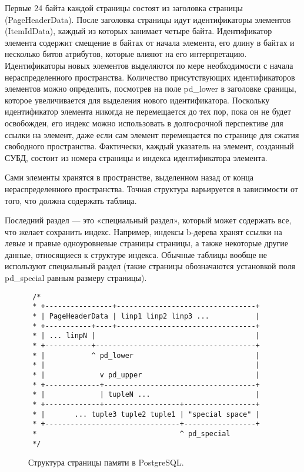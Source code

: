 \documentclass[12pt,oneside]{amsart}
\begin{document}
Первые 24 байта каждой страницы состоят из заголовка страницы (PageHeaderData). После заголовка страницы идут идентификаторы элементов (ItemIdData), каждый из которых занимает четыре байта. Идентификатор элемента содержит смещение в байтах от начала элемента, его длину в байтах и несколько битов атрибутов, которые влияют на его интерпретацию. Идентификаторы новых элементов выделяются по мере необходимости с начала нераспределенного пространства. Количество присутствующих идентификаторов элементов можно определить, посмотрев на поле pd\_lower в заголовке сраницы, которое увеличивается для выделения нового идентификатора. Поскольку идентификатор элемента никогда не перемещается до тех пор, пока он не будет освобожден, его индекс можно использовать в долгосрочной перспективе для ссылки на элемент, даже если сам элемент перемещается по странице для сжатия свободного пространства. Фактически, каждый указатель на элемент, созданный СУБД, состоит из номера страницы и индекса идентификатора элемента.

Сами элементы хранятся в пространстве, выделенном назад от конца нераспределенного пространства. Точная структура варьируется в зависимости от того, что должна содержать таблица.

Последний раздел — это «специальный раздел», который может содержать все, что желает сохранить индекс. Например, индексы b-дерева хранят ссылки на левые и правые одноуровневые страницы страницы, а также некоторые другие данные, относящиеся к структуре индекса. Обычные таблицы вообще не используют специальный раздел (такие страницы обозначаются установкой поля pd\_special равным размеру страницы).

\begin{figure}[ht!]
\begin{lstlisting}
 /*
 * +----------------+---------------------------------+
 * | PageHeaderData | linp1 linp2 linp3 ...           |
 * +-----------+----+---------------------------------+
 * | ... linpN |									  |
 * +-----------+--------------------------------------+
 * |		   ^ pd_lower							  |
 * |												  |
 * |			 v pd_upper							  |
 * +-------------+------------------------------------+
 * |			 | tupleN ...                         |
 * +-------------+------------------+-----------------+
 * |	   ... tuple3 tuple2 tuple1 | "special space" |
 * +--------------------------------+-----------------+
 *									^ pd_special
 */
\end{lstlisting}
\caption{Структура страницы памяти в PostgreSQL.}
\end{figure}
\end{document}
